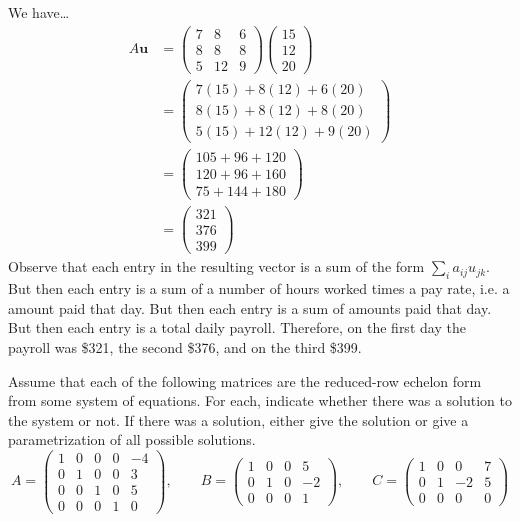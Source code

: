 \documentclass[11pt,letterpaper]{article}
\begin{document}
\sol We have\dots
	\[
	\begin{aligned}
	A\mathbf{u}&= \begin{pmatrix} 7 & 8 & 6 \\ 8 & 8 & 8 \\ 5 & 12 & 9 \end{pmatrix} \begin{pmatrix} 15 \\ 12 \\ 20 \end{pmatrix} \\[0.3cm]
	&= \begin{pmatrix} 7(15) + 8(12) + 6(20) \\ 8(15) + 8(12) + 8(20) \\ 5(15) + 12(12) + 9(20) \end{pmatrix} \\[0.3cm]
	&= \begin{pmatrix} 105 + 96 + 120 \\ 120 + 96 + 160 \\ 75 + 144 + 180 \end{pmatrix} \\[0.3cm]
	&= \begin{pmatrix} 321 \\ 376 \\ 399 \end{pmatrix}
	\end{aligned}
	\]
Observe that each entry in the resulting vector is a sum of the form $\sum_i a_{ij} u_{jk}$. But then each entry is a sum of a number of hours worked times a pay rate, i.e. a amount paid that day. But then each entry is a sum of amounts paid that day. But then each entry is a total daily payroll. Therefore, on the first day the payroll was \$321, the second \$376, and on the third \$399. 



\newpage



 Assume that each of the following matrices are the reduced-row echelon form from some system of equations. For each, indicate whether there was a solution to the system or not. If there was a solution, either give the solution or give a parametrization of all possible solutions. 
	\[
	A= \begin{pmatrix} 1 & 0 & 0 & 0 & -4 \\ 0 & 1 & 0 & 0 & 3 \\ 0 & 0 & 1 & 0 & 5 \\ 0 & 0 & 0 & 1 & 0  \end{pmatrix}, \qquad B= \begin{pmatrix} 1 & 0 & 0 & 5 \\ 0 & 1 & 0 & -2 \\ 0 & 0 & 0 & 1 \end{pmatrix}, \qquad C= \begin{pmatrix} 1 & 0 & 0 & 7 \\ 0 & 1 & -2 & 5 \\ 0 & 0 & 0 & 0 \end{pmatrix}
	\] \pspace
\end{document}
